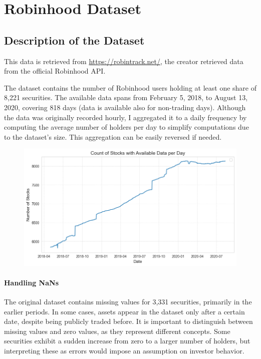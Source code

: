 \section{Robinhood Dataset}
\subsection{Description of the Dataset}
This data is retrieved from \url{https://robintrack.net/}, the creator retrieved data from the official Robinhood API.

The dataset contains the number of Robinhood users holding at least one share of 8,221 securities. The available data spans from February 5, 2018, to August 13, 2020, covering 818 days (data is available also for non-trading days). Although the data was originally recorded hourly, I aggregated it to a daily frequency by computing the average number of holders per day to simplify computations due to the dataset's size. This aggregation can be easily reversed if needed. 


\begin{figure}[h!]
        \centering
        \includegraphics[width=0.8\linewidth]{../images/no_stocks_date.png}
        
\end{figure}


\paragraph{Handling NaNs}  
The original dataset contains missing values for 3,331 securities, primarily in the earlier periods. In some cases, assets appear in the dataset only after a certain date, despite being publicly traded before. It is important to distinguish between missing values and zero values, as they represent different concepts. Some securities exhibit a sudden increase from zero to a larger number of holders, but interpreting these as errors would impose an assumption on investor behavior.  

